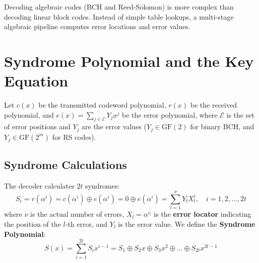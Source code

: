 \documentclass[12pt,a4paper]{article}
\begin{document}
Decoding algebraic codes (BCH and Reed-Solomon) is more complex than decoding linear block codes. Instead of simple table lookups, a multi-stage algebraic pipeline computes error locations and error values.

\begin{tcolorbox}[tikzbox, title={BCH and Reed-Solomon Decoding Flowchart}]
\centering
{}
\end{tcolorbox}

\section{Syndrome Polynomial and the Key Equation}

Let $c(x)$ be the transmitted codeword polynomial, $r(x)$ be the received polynomial, and $e(x) = \sum_{j \in \mathcal{E}} Y_j x^j$ be the error polynomial, where $\mathcal{E}$ is the set of error positions and $Y_j$ are the error values ($Y_j \in \text{GF}(2)$ for binary BCH, and $Y_j \in \text{GF}(2^m)$ for RS codes).

\subsection{Syndrome Calculations}
The decoder calculates $2t$ syndromes:
\[ S_i = r(\alpha^i) = c(\alpha^i) \oplus e(\alpha^i) = 0 \oplus e(\alpha^i) = \sum_{l=1}^\nu Y_l X_l^i, \quad i = 1, 2, \dots, 2t \]
where $\nu$ is the actual number of errors, $X_l = \alpha^{i_l}$ is the \textbf{error locator} indicating the position of the $l$-th error, and $Y_l$ is the error value.
We define the \textbf{Syndrome Polynomial}:
\[ S(x) = \sum_{i=1}^{2t} S_i x^{i-1} = S_1 \oplus S_2 x \oplus S_3 x^2 \oplus \dots \oplus S_{2t} x^{2t-1} \]
\end{document}

